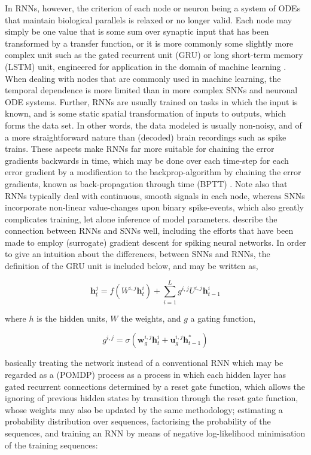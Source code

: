 \documentclass[mphil,deptreport,ianc]{infthesis} %
\begin{document}
In RNNs, however, the criterion of each node or neuron being a system of ODEs that maintain biological parallels is relaxed or no longer valid. 
Each node may simply be one value that is some sum over synaptic input that has been transformed by a transfer function, or it is more commonly some slightly more complex unit such as the gated recurrent unit (GRU) \cite{Bengio2013b, Chung2015a} or long short-term memory (LSTM) unit, engineered for application in the domain of machine learning \cite{Hochreiter1997, Schmidhuber2014}.
When dealing with nodes that are commonly used in machine learning, the temporal dependence is more limited than in more complex SNNs and neuronal ODE systems.
Further, RNNs are usually trained on tasks in which the input is known, and is some static spatial transformation of inputs to outputs, which forms the data set.
In other words, the data modeled is usually non-noisy, and of a more straightforward nature than (decoded) brain recordings such as spike trains.
These aspects make RNNs far more suitable for chaining the error gradients backwards in time, which may be done over each time-step for each error gradient by a modification to the backprop-algorithm by chaining the error gradients, known as back-propagation through time (BPTT) \cite{Rumelhart1986}.
Note also that RNNs typically deal with continuous, smooth signals in each node, whereas SNNs incorporate non-linear value-changes upon binary spike-events, which also greatly complicates training, let alone inference of model parameters.
\cite{Neftci2019} describe the connection between RNNs and SNNs well, including the efforts that have been made to employ (surrogate) gradient descent for spiking neural networks.
In order to give an intuition about the differences, between SNNs and RNNs, the definition of the GRU unit is included below, and may be written as,

\begin{equation}
    \textbf{h}_t^j = \textit{f}(W^{i,j}\textbf{h}_t^i) + \sum_{i=1}^L g^{i,j} U^{i,j}\textbf{h}_{t-1}^i
\end{equation}

where $h$ is the hidden units, $W$ the weights, and $g$ a gating function,

\begin{equation}
    g^{i,j} = \sigma ( \textbf{w}_g^{i,j}\textbf{h}_t^{i} + \textbf{u}_g^{i,j}\textbf{h}_{t-1}^{*})
\end{equation}

basically treating the network instead of a conventional RNN which may be regarded as a (POMDP) process as a process in which each hidden layer has gated recurrent connections determined by a reset gate function, which allows the ignoring of previous hidden states by transition through the reset gate function, whose weights may also be updated by the same methodology;
estimating a probability distribution over sequences, factorising the probability of the sequences, and training an RNN by means of negative log-likelihood minimisation of the training sequences:
\end{document}
